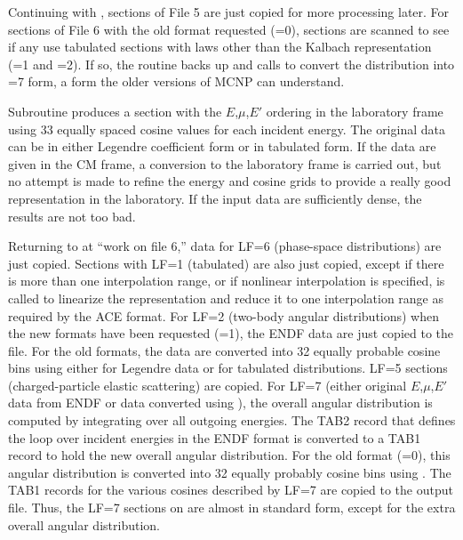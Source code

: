 Continuing with , sections of File 5 are just copied
for more processing later.  For sections of File 6 with the old
format requested (=0), sections are scanned to see
if any use tabulated sections with laws other than the Kalbach
representation (=1 and =2).  If so, the
routine backs up and calls  to convert the distribution
into =7 form, a form the older versions of MCNP can
understand.

Subroutine 
produces a section with the $E$,$\mu$,$E'$
ordering in the laboratory frame using 33 equally spaced cosine
values for each incident energy.  The original data can be in either
Legendre coefficient form or in tabulated form.  If the data are
given in the CM frame, a conversion to the laboratory frame is
carried out, but no attempt is made to refine the energy and cosine
grids to provide a really good representation in the laboratory.
If the input data are sufficiently dense, the results are not too
bad.

Returning to  at ``work on file 6,'' data for LF=6
(phase-space distributions) are just copied.  Sections with LF=1
(tabulated) are also just copied, except if there is more than
one interpolation range, or if nonlinear interpolation is
specified,  is called
to linearize the representation and reduce it to one
interpolation range as required by the ACE format.  For
LF=2 (two-body angular distributions) when the new
formats have been requested (=1), the ENDF data are
just copied to the  file.  For the old formats, the
data are converted into 32 equally probable cosine bins using either
 for Legendre data or  for tabulated
distributions.  LF=5 sections (charged-particle elastic scattering)
are copied.  For LF=7 (either original $E$,$\mu$,$E'$ data from
ENDF or data converted using ), the overall angular
distribution is computed by integrating over all outgoing energies.
The TAB2 record that defines the loop over incident energies in
the ENDF format is converted to a TAB1 record to hold the new
overall angular distribution.  For the old format (=0),
this angular distribution is converted into 32 equally probably
cosine bins using .  The TAB1 records for the
various cosines described by LF=7 are copied to the output file.
Thus, the LF=7 sections on  are almost in standard
form, except for the extra overall angular distribution.

